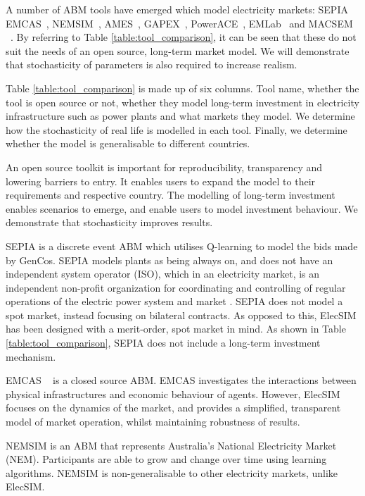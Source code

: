 A number of ABM tools have emerged which model electricity markets: SEPIA~\cite{Harp2000} EMCAS~\cite{Conzelmann}, NEMSIM~\cite{Batten2006}, AMES~\cite{Sun2007}, GAPEX~\cite{Cincotti2013}, PowerACE~\cite{Rothengatter2007}, EMLab~\cite{Chappin2017} and MACSEM ~\cite{Praca2003}. By referring to Table \ref{table:tool_comparison}, it can be seen that these do not suit the needs of an open source, long-term market model. We will demonstrate that stochasticity of parameters is also required to increase realism.

Table \ref{table:tool_comparison} is made up of six columns. Tool name, whether the tool is open source or not, whether they model long-term investment in electricity infrastructure such as power plants and what markets they model. We determine how the stochasticity of real life is modelled in each tool. Finally, we determine whether the model is generalisable to different countries. 


An open source toolkit is important for reproducibility, transparency and lowering barriers to entry. It enables users to expand the model to their requirements and respective country. The modelling of long-term investment enables scenarios to emerge, and enable users to model investment behaviour. We demonstrate that stochasticity improves results.

SEPIA \cite{Harp2000} is a discrete event ABM which utilises Q-learning to model the bids made by GenCos. SEPIA models plants as being always on, and does not have an independent system operator (ISO), which in an electricity market, is an independent non-profit organization for coordinating and controlling of regular operations of the electric power system and market \cite{Zhou2007}. SEPIA does not model a spot market, instead focusing on bilateral contracts. As opposed to this, ElecSIM has been designed with a merit-order, spot market in mind. As shown in Table \ref{table:tool_comparison}, SEPIA does not include a long-term investment mechanism. 

EMCAS ~\cite{Conzelmann} is a closed source ABM. EMCAS investigates the interactions between physical infrastructures and economic behaviour of agents. However, ElecSIM focuses on the dynamics of the market, and provides a simplified, transparent model of market operation, whilst maintaining robustness of results.

NEMSIM \cite{Grozev2005} is an ABM that represents Australia's National Electricity Market (NEM). Participants are able to grow and change over time using learning algorithms. NEMSIM is non-generalisable to other electricity markets, unlike ElecSIM.

